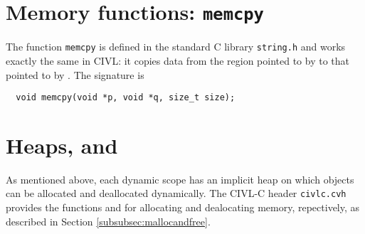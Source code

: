 \section{Memory functions: \texttt{memcpy}}

The function \texttt{memcpy} is defined in the standard C library
\texttt{string.h} and works exactly the same in CIVL: it copies
data from the region pointed to by  to that pointed to by
.  The signature is

\begin{verbatim}
  void memcpy(void *p, void *q, size_t size);
\end{verbatim}

\section{Heaps, \cmalloc{} and \cfree}

As mentioned above, each dynamic scope has an implicit heap on which
objects can be allocated and deallocated dynamically.  The CIVL-C header
\texttt{civlc.cvh} provides the functions \cmalloc{} and \cfree{} for allocating and dealocating
memory, repectively, as described in Section \ref{subsubsec:mallocandfree}.





